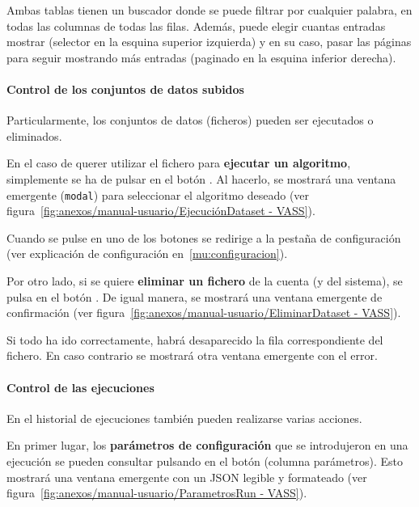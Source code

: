 
Ambas tablas tienen un buscador donde se puede filtrar por cualquier palabra, en
todas las columnas de todas las filas. Además, puede elegir cuantas entradas
mostrar (selector en la esquina superior izquierda) y en su caso, pasar las
páginas para seguir mostrando más entradas (paginado en la esquina inferior
derecha).

\paragraph{Control de los conjuntos de datos subidos} Particularmente, los
conjuntos de datos (ficheros) pueden ser ejecutados o eliminados.

En el caso de querer utilizar el fichero para \textbf{ejecutar un algoritmo},
simplemente se ha de pulsar en el botón \button[vassgold]{$\blacktriangleright$}. Al
hacerlo, se mostrará una ventana emergente (\texttt{modal}) para seleccionar el
algoritmo deseado (ver figura~\ref{fig:anexos/manual-usuario/EjecuciónDataset -
VASS}).


Cuando se pulse en uno de los botones se redirige a la pestaña de configuración
(ver explicación de configuración en~\ref{mu:configuracion}).

\label{mu:eliminardataset}
Por otro lado, si se quiere \textbf{eliminar un fichero} de la cuenta (y del
sistema), se pulsa en el botón \button[vassred]{\faTrash}. De igual manera, se
mostrará una ventana emergente de confirmación (ver
figura~\ref{fig:anexos/manual-usuario/EliminarDataset - VASS}).


Si todo ha ido correctamente, habrá desaparecido la fila correspondiente del
fichero. En caso contrario se mostrará otra ventana emergente con el error.

\paragraph{Control de las ejecuciones} En el historial de ejecuciones también
pueden realizarse varias acciones.

\label{mu:parametrosrun}
En primer lugar, los \textbf{parámetros de configuración} que se introdujeron en
una ejecución se pueden consultar pulsando en el botón
\button[vassgreen]{\faFileTextO} (columna parámetros). Esto mostrará una ventana
emergente con un JSON legible y formateado (ver
figura~\ref{fig:anexos/manual-usuario/ParametrosRun - VASS}).

